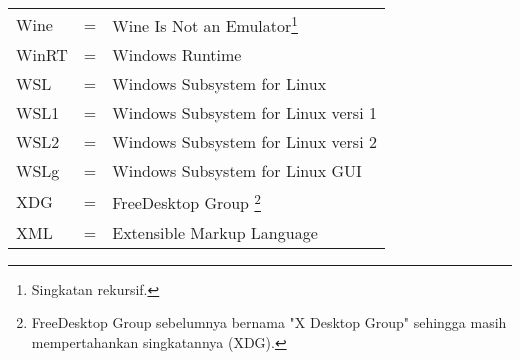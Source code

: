 \begin{longtable}{llp{3in}}
    Wine & \hspace{1.5cm} = & Wine Is Not an Emulator\footnote{Singkatan rekursif.}\\
    WinRT & \hspace{1.5cm} = & Windows Runtime\\
    WSL & \hspace{1.5cm} = & Windows Subsystem for Linux\\
    WSL1 & \hspace{1.5cm} = & Windows Subsystem for Linux versi 1\\
    WSL2 & \hspace{1.5cm} = & Windows Subsystem for Linux versi 2\\
    WSLg & \hspace{1.5cm} = & Windows Subsystem for Linux GUI\\
    XDG & \hspace{1.5cm} = & FreeDesktop Group \footnote{FreeDesktop Group sebelumnya bernama "X Desktop Group" sehingga masih mempertahankan singkatannya (XDG).}\\
    XML & \hspace{1.5cm} = & Extensible Markup Language
\end{longtable}
